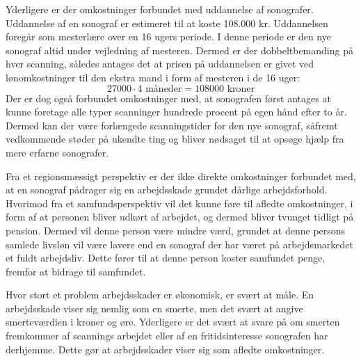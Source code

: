 Yderligere er der omkostninger forbundet med uddannelse af sonografer. Uddannelse af en sonograf er estimeret til at koste 108.000 kr. Uddannelsen foregår som mesterlære over en 16 ugers periode. I denne periode er den nye sonograf altid under vejledning af mesteren. Dermed er der dobbeltbemanding på hver scanning, således antages det at prisen på uddannelsen er givet ved lønomkostninger til den ekstra mand i form af mesteren i de 16 uger:
\begin{equation}
27000\cdot4 \text{ måneder} = 108000 \text{ kroner}
\end{equation}
Der er dog også forbundet omkostninger med, at sonografen først antages at kunne foretage alle typer scanninger hundrede procent på egen hånd efter to år. Dermed kan der være forlængede scanningstider for den nye sonograf, såfremt vedkommende støder på ukendte ting og bliver nødsaget til at opsøge hjælp fra mere erfarne sonografer. 

Fra et regionsmæssigt perspektiv er der ikke direkte omkostninger forbundet med, at en sonograf pådrager sig en arbejdsskade grundet dårlige arbejdsforhold. Hvorimod fra et samfundsperspektiv vil det kunne føre til afledte omkostninger, i form af at personen bliver udkørt af arbejdet, og dermed bliver tvunget tidligt på pension. Dermed vil denne person være mindre værd, grundet at denne persons samlede livsløn vil være lavere end en sonograf der har været på arbejdsmarkedet et fuldt arbejdsliv. Dette fører til at denne person koster samfundet penge, fremfor at bidrage til samfundet. 

Hvor stort et problem arbejdsskader er økonomisk, er svært at måle. En arbejdsskade viser sig nemlig som en smerte, men det svært at angive smerteværdien i kroner og øre. Yderligere er det svært at svare på om smerten fremkommer af scannings arbejdet eller af en fritidsinteresse sonografen har derhjemme. Dette gør at arbejdsskader viser sig som afledte omkostninger.

